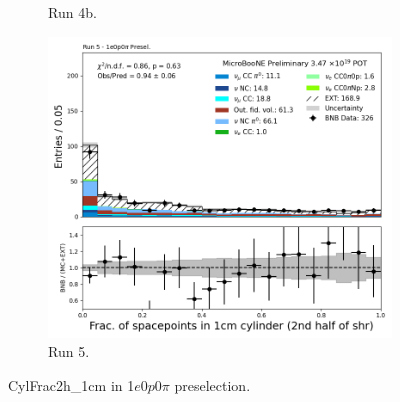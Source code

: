\begin{figure}[H]
\begin{subfigure}[t]{0.32\linewidth}
        \caption{Run 4b.}
    \end{subfigure}%
    \hspace{0.2cm}%
    \begin{subfigure}[t]{0.32\linewidth}
        \includegraphics[width=\linewidth]{technote/Appendix_Preselection/Figures/1e0p0pi/Run5/CylFrac2h_1cm_Run5_1e0p0pi_Presel.png}
        \caption{Run 5.}
    \end{subfigure}
    \caption{CylFrac2h\_1cm in 1$e$0$p$0$\pi$ preselection.}
\end{figure}

